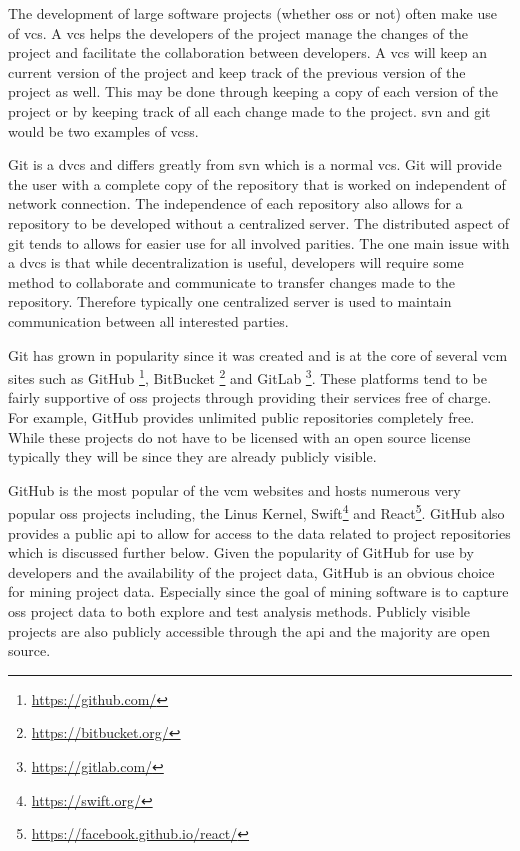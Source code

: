 The development of large software projects (whether \gls{oss} or not) often make use of \gls{vcs}. A \gls{vcs} helps the developers of the project manage the changes of the project and facilitate the collaboration between developers. A \gls{vcs} will keep an current version of the project and keep track of the previous version of the project as well. This may be done through keeping a copy of each version of the project or by keeping track of all each change made to the project. \gls{svn} and git would be two examples of \gls{vcs}s.

Git is a \gls{dvcs} and differs greatly from \gls{svn} which is a normal \gls{vcs}. Git will provide the user with a complete copy of the repository that is worked on independent of network connection. The independence of each repository also allows for a repository to be developed without a centralized server. The distributed aspect of git tends to allows for easier use for all involved parities. The one main issue with a \gls{dvcs} is that while decentralization is useful, developers will require some method to collaborate and communicate to transfer changes made to the repository. Therefore typically one centralized server is used to maintain communication between all interested parties.

Git has grown in popularity since it was created and is at the core of several \gls{vcm} sites such as GitHub \footnote{\url{https://github.com/}}, BitBucket \footnote{\url{https://bitbucket.org/}} and GitLab \footnote{\url{https://gitlab.com/}}. These platforms tend to be fairly supportive of \gls{oss} projects through providing their services free of charge. For example, GitHub provides unlimited public repositories completely free. While these projects do not have to be licensed with an open source license typically they will be since they are already publicly visible.


GitHub is the most popular of the \gls{vcm} websites and hosts numerous very popular \gls{oss} projects including, the Linus Kernel, Swift\footnote{\url{https://swift.org/}} and React\footnote{\url{https://facebook.github.io/react/}}. GitHub also provides a public \gls{api} to allow for access to the data related to project repositories which is discussed further below. %
Given the popularity of GitHub for use by developers and the availability of the project data, GitHub is an obvious choice for mining project data. Especially since the goal of mining software is to capture \gls{oss} project data to both explore and test analysis methods. Publicly visible projects are also publicly accessible through the \gls{api} and the majority are open source.

